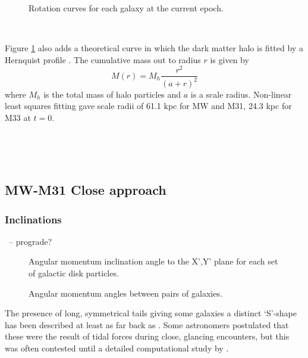 \documentclass[twocolumn]{aastex63}
\newcommand{\todo}{\color{red}{TODO}\color{black}\hspace{2mm}}
\begin{document}
\begin{figure}[bht!]
	\caption{Rotation curves for each galaxy at the current epoch.
		\label{fig:rotcurve0}}
\end{figure}


\todo{set xlim, make y axis log}\ 

Figure \ref{fig:rotcurve0} also adds a theoretical curve in which the dark matter halo is fitted by a Hernquist profile \citep{hernquist_analytical_1990}. The cumulative mass out to radius $r$ is given by
\[ M(r) = M_h \frac{r^2}{(a+r)^2} \]
where $M_h$ is the total mass of halo particles and $a$ is a scale radius. Non-linear least squares fitting gave scale radii of 61.1 kpc for MW and M31, 24.3 kpc for M33 at $t=0$.

\todo{identify the bar?}\ 

\todo{sersic profiles at various stages?}\ 

\todo{time evolution of Herquist a?}

\todo{more on spiral arms}

\subsection{MW-M31 Close approach}

\subsubsection{Inclinations}

\todo{Relative rotation axes of disks}\ --  prograde?

\begin{figure}[ht!]
	\caption{Angular momentum inclination angle to the X',Y' plane for each set of galactic disk particles.
		\label{fig:inclinations_xy}}
\end{figure}

\begin{figure}[ht!]
	\caption{Angular momentum angles between pairs of galaxies.
		\label{fig:inclinations_mutual}}
\end{figure}


The presence of long, symmetrical tails giving some galaxies a distinct `S'-shape has been described at least as far back as \citet{zwicky_novel_1955}. Some astronomers postulated that these were the result of tidal forces during close, glancing encounters, but this was often contested until a detailed computational study by \citet{toomre_galactic_1972}.
\end{document}
